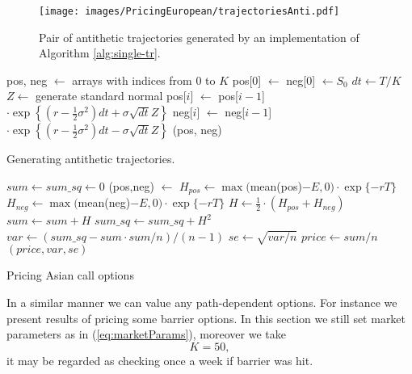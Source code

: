 \documentclass[a4paper,12pt, oneside]{book}
\theoremstyle{definition}
\theoremstyle{remark}
\begin{document}
\begin{figure}
\centering
 \texttt{[image: images/PricingEuropean/trajectoriesAnti.pdf]}
\caption{Pair of antithetic trajectories generated by an implementation of Algorithm \ref{alg:single-tr}.}
\label{fig:trajectoriesAnti}
\end{figure}
\begin{algorithm}
 \begin{algorithmic}[1]
  \State pos, neg $\gets$ arrays with indices from $0$ to $K$
  \State pos[0] $\gets$ neg[0] $\gets S_0$
  \State $dt \gets T/K$
    \State $Z \gets$ generate standard normal
    \State pos[$i$] $\gets$ pos[$i-1$] $\cdot \exp\left\{ (r - \frac{1}{2}\sigma^2) dt + \sigma \sqrt{dt} Z \right\}$
    \State neg[$i$] $\gets$ neg[$i-1$] $\cdot \exp\left\{ (r - \frac{1}{2}\sigma^2) dt - \sigma \sqrt{dt} Z \right\}$
  \EndFor
  \State \Return (pos, neg)
  \EndFunction
 \end{algorithmic}
 \caption{Generating antithetic trajectories.}
 \label{alg:single-tr}
\end{algorithm}
 
\begin{algorithm}
 \begin{algorithmic}[1]
    \State  $sum \gets sum\_sq \gets 0$
      \State (pos,neg) $\gets$ 
      \State $H_{pos} \gets \max($mean(pos)$- E, 0) \cdot \exp\{-rT\}$
      \State $H_{neg} \gets \max($mean(neg)$- E, 0) \cdot \exp\{-rT\}$
      \State $H \gets \frac{1}{2} \cdot (H_{pos} + H_{neg})$
      \State $sum \gets sum + H$
      \State $ sum\_sq \gets sum\_sq + H^2$
    \EndFor
    \State $var \gets (sum\_sq - sum \cdot sum/n) / (n-1)$
    \State $se \gets \sqrt{var / n}$
    \State $price \gets sum / n$
    \State \Return $(price, var, se)$
  \EndFunction
 \end{algorithmic}
 \caption{Pricing Asian call options}
 \label{alg:priceAsianAV}
\end{algorithm}

In a similar manner we can value any path-dependent options. For instance we present results of pricing some barrier options. In this section we still set market parameters as in (\ref{eq:marketParams}), moreover we take
\[ K = 50, \]
it may be regarded as checking once a week if barrier was hit.
\end{document}
